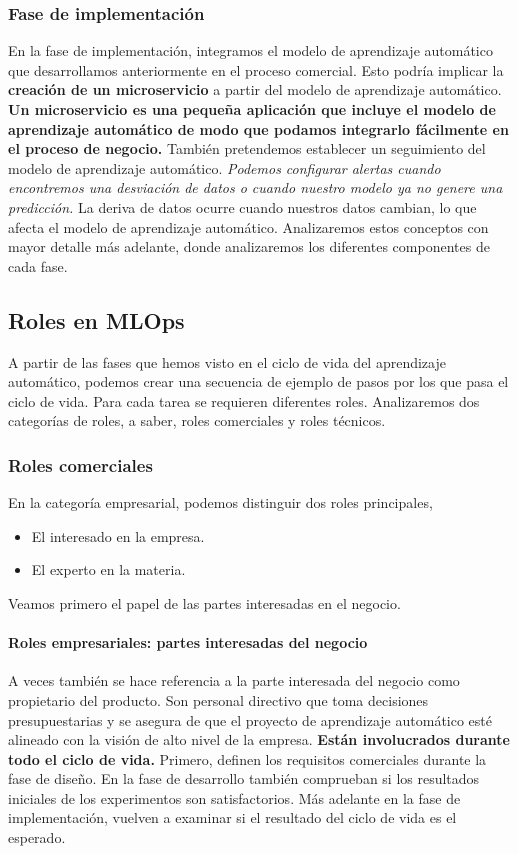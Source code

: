 \documentclass[10pt]{book}
\begin{document}
\subsubsection{Fase de implementación}
En la fase de implementación, integramos el modelo de aprendizaje automático que desarrollamos anteriormente en el proceso comercial. Esto podría implicar la \textbf{creación de un microservicio} a partir del modelo de aprendizaje automático. \textbf{Un microservicio es una pequeña aplicación que incluye el modelo de aprendizaje automático de modo que podamos integrarlo fácilmente en el proceso de negocio.} También pretendemos establecer un seguimiento del modelo de aprendizaje automático. \textit{Podemos configurar alertas cuando encontremos una desviación de datos o cuando nuestro modelo ya no genere una predicción.} La deriva de datos ocurre cuando nuestros datos cambian, lo que afecta el modelo de aprendizaje automático. Analizaremos estos conceptos con mayor detalle más adelante, donde analizaremos los diferentes componentes de cada fase.


\subsection{Roles en MLOps}

A partir de las fases que hemos visto en el ciclo de vida del aprendizaje automático, podemos crear una secuencia de ejemplo de pasos por los que pasa el ciclo de vida. Para cada tarea se requieren diferentes roles. Analizaremos dos categorías de roles, a saber, roles comerciales y roles técnicos.

\subsubsection{Roles comerciales}
En la categoría empresarial, podemos distinguir dos roles principales, 
\begin{itemize}
	\item El interesado en la empresa.
	\item El experto en la materia.
\end{itemize}
Veamos primero el papel de las partes interesadas en el negocio.

\paragraph{Roles empresariales: partes interesadas del negocio}
A veces también se hace referencia a la parte interesada del negocio como propietario del producto. Son personal directivo que toma decisiones presupuestarias y se asegura de que el proyecto de aprendizaje automático esté alineado con la visión de alto nivel de la empresa. \textbf{Están involucrados durante todo el ciclo de vida.} Primero, definen los requisitos comerciales durante la fase de diseño. En la fase de desarrollo también comprueban si los resultados iniciales de los experimentos son satisfactorios. Más adelante en la fase de implementación, vuelven a examinar si el resultado del ciclo de vida es el esperado.
\end{document}
